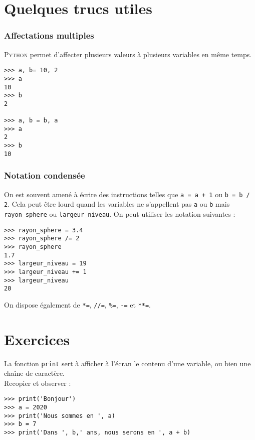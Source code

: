 \section{Quelques \og trucs \fg{} utiles}

\subsubsection*{Affectations multiples}
\textsc{Python} permet d'affecter plusieurs valeurs à plusieurs variables en même temps.

\begin{pys}\begin{verbatim}
>>> a, b= 10, 2
>>> a
10
>>> b
2

>>> a, b = b, a
>>> a
2
>>> b
10
\end{verbatim}
\end{pys}

\subsubsection*{Notation condensée}
On est souvent amené à écrire des instructions telles que  \texttt{a = a + 1} ou \texttt{b = b / 2}. Cela peut être lourd quand les variables ne s'appellent
pas \texttt{a} ou \texttt{b} mais \texttt{rayon_sphere} ou \texttt{largeur_niveau}. On peut utiliser les notation suivantes :
\begin{pys}\begin{verbatim}
>>> rayon_sphere = 3.4
>>> rayon_sphere /= 2
>>> rayon_sphere
1.7
>>> largeur_niveau = 19
>>> largeur_niveau += 1
>>> largeur_niveau
20
\end{verbatim}
\end{pys}

On dispose également de \texttt{*=}, \texttt{//=}, \texttt{\%=}, \texttt{-=} et \texttt{**=}.
\section{Exercices}

\begin{exercice}

    La fonction \texttt{print} sert à afficher à l'écran le contenu d'une variable, ou bien une chaîne de caractère.\\
    Recopier et observer :
\begin{verbatim}
>>> print('Bonjour')
>>> a = 2020
>>> print('Nous sommes en ', a)
>>> b = 7
>>> print('Dans ', b,' ans, nous serons en ', a + b)
\end{verbatim}
\end{exercice}


